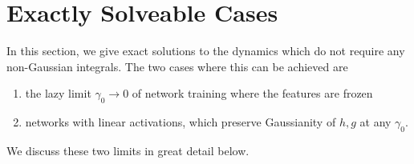 \documentclass{article} %
\begin{document}
\section{Exactly Solveable Cases}

In this section, we give exact solutions to the dynamics which do not require any non-Gaussian integrals. The two cases where this can be achieved are 
\begin{enumerate}
    \item the lazy limit $\gamma_0 \to 0$ of network training where the features are frozen
    \item networks with linear activations, which preserve Gaussianity of $h, g$ at any $\gamma_0$.  
\end{enumerate}
We discuss these two limits in great detail below. 
\end{document}

